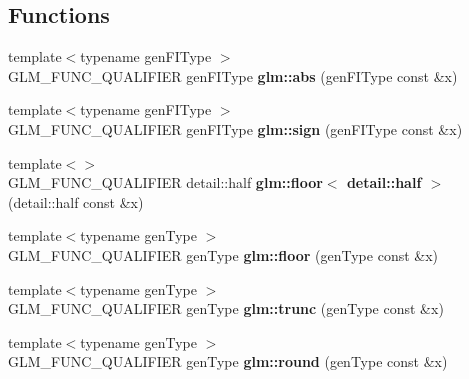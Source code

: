 \subsection*{\-Functions}
\begin{DoxyCompactItemize}
\item 
\hypertarget{namespaceglm_a5c82b1e2a9cb12b4a70d22a8f987273d}{{\footnotesize template$<$typename gen\-F\-I\-Type $>$ }\\\-G\-L\-M\-\_\-\-F\-U\-N\-C\-\_\-\-Q\-U\-A\-L\-I\-F\-I\-E\-R gen\-F\-I\-Type {\bfseries glm\-::abs} (gen\-F\-I\-Type const \&x)}\label{namespaceglm_a5c82b1e2a9cb12b4a70d22a8f987273d}

\item 
\hypertarget{namespaceglm_aaa1babcfcb872aa6bf5e701c20ac4fda}{{\footnotesize template$<$typename gen\-F\-I\-Type $>$ }\\\-G\-L\-M\-\_\-\-F\-U\-N\-C\-\_\-\-Q\-U\-A\-L\-I\-F\-I\-E\-R gen\-F\-I\-Type {\bfseries glm\-::sign} (gen\-F\-I\-Type const \&x)}\label{namespaceglm_aaa1babcfcb872aa6bf5e701c20ac4fda}

\item 
\hypertarget{namespaceglm_ad87110896994fda992155f8ee13ca1ee}{{\footnotesize template$<$$>$ }\\\-G\-L\-M\-\_\-\-F\-U\-N\-C\-\_\-\-Q\-U\-A\-L\-I\-F\-I\-E\-R detail\-::half {\bfseries glm\-::floor$<$ detail\-::half $>$} (detail\-::half const \&x)}\label{namespaceglm_ad87110896994fda992155f8ee13ca1ee}

\item 
\hypertarget{namespaceglm_a591dc46d75c6de9539dd26bd7c7d0163}{{\footnotesize template$<$typename gen\-Type $>$ }\\\-G\-L\-M\-\_\-\-F\-U\-N\-C\-\_\-\-Q\-U\-A\-L\-I\-F\-I\-E\-R gen\-Type {\bfseries glm\-::floor} (gen\-Type const \&x)}\label{namespaceglm_a591dc46d75c6de9539dd26bd7c7d0163}

\item 
\hypertarget{namespaceglm_a2ac00b7e133fa215bcdd818dbbde4fa5}{{\footnotesize template$<$typename gen\-Type $>$ }\\\-G\-L\-M\-\_\-\-F\-U\-N\-C\-\_\-\-Q\-U\-A\-L\-I\-F\-I\-E\-R gen\-Type {\bfseries glm\-::trunc} (gen\-Type const \&x)}\label{namespaceglm_a2ac00b7e133fa215bcdd818dbbde4fa5}

\item 
\hypertarget{namespaceglm_aa6be799b74bd2c553689b6a6137adf22}{{\footnotesize template$<$typename gen\-Type $>$ }\\\-G\-L\-M\-\_\-\-F\-U\-N\-C\-\_\-\-Q\-U\-A\-L\-I\-F\-I\-E\-R gen\-Type {\bfseries glm\-::round} (gen\-Type const \&x)}\label{namespaceglm_aa6be799b74bd2c553689b6a6137adf22}


\end{DoxyCompactItemize}
